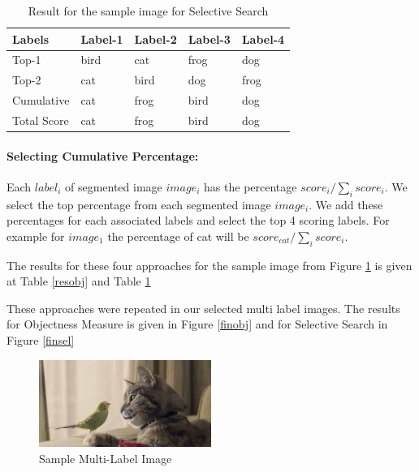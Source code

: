 \begin{table}
\centering
\caption{Result for the sample image for Selective Search}
\label{ressel}
\begin{tabularx}{\linewidth}{|*{5}{X|}}
\hline
Labels      & Label-1 & Label-2 & Label-3 & Label-4 \\ \hline
Top-1       & bird    & cat     & frog    & dog           \\ \hline
Top-2       & cat     & bird    & dog     & frog           \\ \hline
Cumulative  & cat     & frog    & bird    & dog            \\ \hline
Total Score & cat     & frog    & bird    & dog           \\ \hline
\end{tabularx}
\end{table}



\paragraph{Selecting Cumulative Percentage:}
Each $label_{i}$ of segmented image $image_{i}$ has the percentage $score_{i} / \sum_{i}{score_{i}}$. We select the top percentage from each segmented image $image_{i}$. We add these percentages for each associated labels and select the top 4 scoring labels. For example for $image_{1}$ the percentage of cat will be $score_{cat} / \sum_{i}{score_{i}}$.\hfill \break

The results for these four approaches for the sample image from Figure \ref{sample_multi_label} is given at Table \ref{resobj} and Table \ref{ressel} \hfill \break


These approaches were repeated in our selected multi label images. The results for Objectness Measure is given in Figure \ref{finobj} and for Selective Search in Figure  \ref{finsel}

\begin{figure}[h!]
  \centering
  \includegraphics[width=0.5\textwidth]{images/sample_multi_label.PNG}
  \caption{Sample Multi-Label Image}\label{sample_multi_label}
\end{figure}


